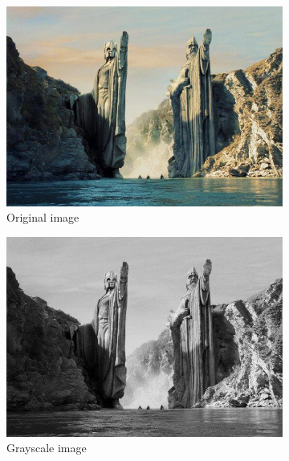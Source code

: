 \documentclass[paper=a4, fontsize=11pt]{scrartcl} %
\numberwithin{equation}{section} %
\numberwithin{figure}{section} %
\numberwithin{table}{section} %
\begin{document}
\graphicspath{{results/}}
\vspace{-2mm}
\begin{figure}[H]
	\caption{Original images and noised image \label{fig:sim}}
	\begin{subfigure}[b]{0.3\textwidth}
		\includegraphics[width=\textwidth]{lotr.jpg}
		\caption{Original image}
	\end{subfigure}
	\hspace{5mm}
	\begin{subfigure}[b]{0.3\textwidth}
		\includegraphics[width=\textwidth]{gray_image.jpg}
		\caption{Grayscale image}
	\end{subfigure}
	\hspace{5mm}
	\begin{subfigure}[b]{0.3\textwidth}

\end{subfigure}
\end{figure}
\end{document}
